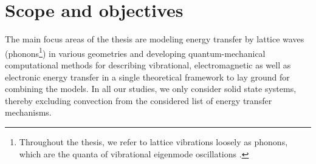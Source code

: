 



\section{Scope and objectives}

 The main focus areas of the thesis are modeling energy transfer by lattice waves (phonons\footnote{Throughout the thesis, we refer to lattice vibrations loosely as phonons, which are the quanta of vibrational eigenmode oscillations \cite{ziman}.}) in various geometries and developing quantum-mechanical computational methods for describing vibrational, electromagnetic as well as electronic energy transfer in a single theoretical framework to lay ground for combining the models. In all our studies, we only consider solid state systems, thereby excluding convection \cite{chen} from the considered list of energy transfer mechanisms. %

